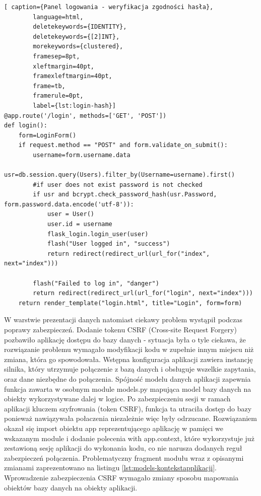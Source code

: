 \documentclass[a4paper, 10pt, twoside, openright]{report}
\begin{document}
\begin{large}
\begin{minipage}{\textwidth}
    \begin{lstlisting}[ caption={Panel logowania - weryfikacja zgodności hasła},
        language=html,
        deletekeywords={IDENTITY},
        deletekeywords={[2]INT},
        morekeywords={clustered},
        framesep=8pt,
        xleftmargin=40pt,
        framexleftmargin=40pt,
        frame=tb,
        framerule=0pt,
        label={lst:login-hash}]
@app.route('/login', methods=['GET', 'POST'])
def login():
    form=LoginForm()
    if request.method == "POST" and form.validate_on_submit():
        username=form.username.data
        usr=db.session.query(Users).filter_by(Username=username).first()
        #if user does not exist password is not checked
        if usr and bcrypt.check_password_hash(usr.Password, form.password.data.encode('utf-8')):
            user = User()
            user.id = username
            flask_login.login_user(user)
            flash("User logged in", "success")
            return redirect(redirect_url(url_for("index", next="index")))

        flash("Failed to log in", "danger")
        return redirect(redirect_url(url_for("login", next="index")))
    return render_template("login.html", title="Login", form=form)\end{lstlisting}
\end{minipage}

\bigskip
{W warstwie prezentacji danych natomiast ciekawy problem wystąpił podczas 
poprawy zabezpieczeń. Dodanie tokenu CSRF (Cross-site Request Forgery) pozbawiło
 aplikację dostępu do bazy danych - sytuacja była o tyle ciekawa, że rozwiązanie 
 problemu wymagało modyfikacji kodu w zupełnie innym miejscu niż zmiana, która go 
spowodowała. Wstępna konfiguracja aplikacji zawiera instancję silnika, który 
utrzymuje połączenie z bazą danych i obsługuje wszelkie zapytania, oraz dane 
niezbędne do połączenia. Spójność modelu danych aplikacji zapewnia funkcja 
zawarta w osobnym module models.py mapująca model bazy danych na obiekty 
wykorzystywane dalej w logice. Po zabezpieczeniu sesji w ramach aplikacji 
kluczem szyfrowania (token CSRF), funkcja ta utraciła dostęp do bazy ponieważ 
nawiązywała połaczenia niezależnie więc były odrzucane. Rozwiązaniem okazał się 
import obiektu app reprezentującego aplikację w pamięci we wskazanym module i 
dodanie polecenia with app.context, które wykorzystuje już zestawioną sesję 
aplikacji do wykonania kodu, co nie narusza dodanych reguł zabezpieczeń 
połączenia. Problematyczny fragment modułu wraz z opisanymi zmianami 
zaprezentowano na listingu \ref{lst:models-kontekstapplikacji}. Wprowadzenie 
zabezpieczenia CSRF wymagało zmiany sposobu mapowania obiektów bazy danych na 
obiekty aplikacji.}


\end{large}
\end{document}
